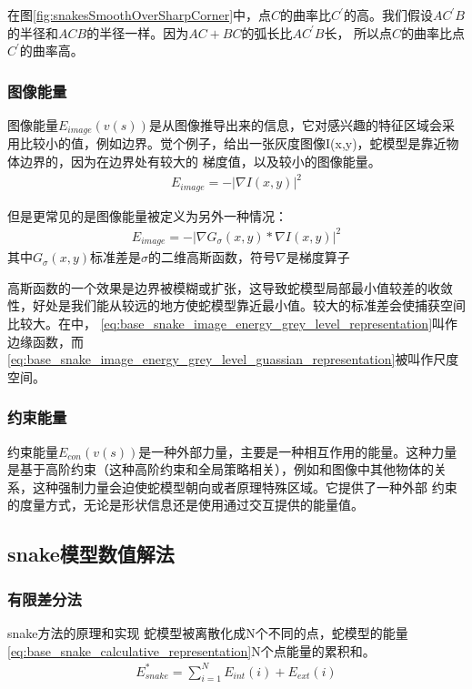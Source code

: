 在图\ref{fig:snakesSmoothOverSharpCorner}中，点$C$的曲率比$C^{'}$的高。我们假设$AC^{'}B$的半径和$ACB$的半径一样。因为$AC+BC$的弧长比$AC^{'}B$长，
所以点$C$的曲率比点$C^{'}$的曲率高。

\subsubsection{图像能量}
图像能量$E_{image}(v(s))$是从图像推导出来的信息，它对感兴趣的特征区域会采用比较小的值，例如边界。觉个例子，给出一张灰度图像I(x,y)，蛇模型是靠近物体边界的，因为在边界处有较大的
梯度值，以及较小的图像能量。
\begin{align}\label{eq:base_snake_image_energy_grey_level_representation}
	E_{image} = -|\nabla I(x,y)|^{2}
\end{align}

但是更常见的是图像能量被定义为另外一种情况：
\begin{align}\label{eq:base_snake_image_energy_grey_level_guassian_representation}
E_{image} = -|\nabla G_{\sigma}(x,y) *  \nabla I(x,y)|^{2}
\end{align}
其中$G_{\sigma}(x,y)$标准差是$\sigma$的二维高斯函数，符号$\nabla$是梯度算子

高斯函数的一个效果是边界被模糊或扩张，这导致蛇模型局部最小值较差的收敛性，好处是我们能从较远的地方使蛇模型靠近最小值。较大的标准差会使捕获空间比较大。在\cite{kass1988snakes}中，
\eqref{eq:base_snake_image_energy_grey_level_representation}叫作边缘函数，而\eqref{eq:base_snake_image_energy_grey_level_guassian_representation}被叫作尺度空间。

\subsubsection{约束能量}
约束能量$E_{con}(v(s))$是一种外部力量，主要是一种相互作用的能量。这种力量是基于高阶约束（这种高阶约束和全局策略相关），例如和图像中其他物体的关系，这种强制力量会迫使蛇模型朝向或者原理特殊区域。它提供了一种外部
约束的度量方式，无论是形状信息还是使用通过交互提供的能量值。


\subsection{snake模型数值解法}
\subsubsection{有限差分法}
snake方法的原理和实现
蛇模型被离散化成N个不同的点，蛇模型的能量\eqref{eq:base_snake_calculative_representation}N个点能量的累积和。
\begin{align}\label{eq:snake_energy_discrete_representation}
E_{snake}^{*} = \sum_{i=1}^{N}E_{int}(i)+E_{ext}(i)
\end{align}

